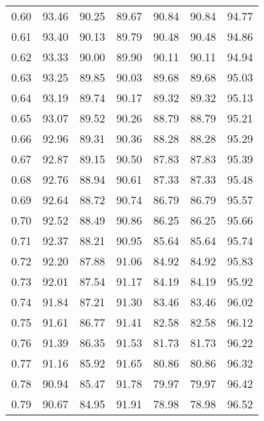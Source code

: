 \begin{tabular}{|c|c|c|c|c|c|c|}
      0.60 &     93.46 &     90.25 &      89.67 &   90.84 &      90.84 &         94.77 \\
      0.61 &     93.40 &     90.13 &      89.79 &   90.48 &      90.48 &         94.86 \\
      0.62 &     93.33 &     90.00 &      89.90 &   90.11 &      90.11 &         94.94 \\
      0.63 &     93.25 &     89.85 &      90.03 &   89.68 &      89.68 &         95.03 \\
      0.64 &     93.19 &     89.74 &      90.17 &   89.32 &      89.32 &         95.13 \\
      0.65 &     93.07 &     89.52 &      90.26 &   88.79 &      88.79 &         95.21 \\
      0.66 &     92.96 &     89.31 &      90.36 &   88.28 &      88.28 &         95.29 \\
      0.67 &     92.87 &     89.15 &      90.50 &   87.83 &      87.83 &         95.39 \\
      0.68 &     92.76 &     88.94 &      90.61 &   87.33 &      87.33 &         95.48 \\
      0.69 &     92.64 &     88.72 &      90.74 &   86.79 &      86.79 &         95.57 \\
      0.70 &     92.52 &     88.49 &      90.86 &   86.25 &      86.25 &         95.66 \\
      0.71 &     92.37 &     88.21 &      90.95 &   85.64 &      85.64 &         95.74 \\
      0.72 &     92.20 &     87.88 &      91.06 &   84.92 &      84.92 &         95.83 \\
      0.73 &     92.01 &     87.54 &      91.17 &   84.19 &      84.19 &         95.92 \\
      0.74 &     91.84 &     87.21 &      91.30 &   83.46 &      83.46 &         96.02 \\
      0.75 &     91.61 &     86.77 &      91.41 &   82.58 &      82.58 &         96.12 \\
      0.76 &     91.39 &     86.35 &      91.53 &   81.73 &      81.73 &         96.22 \\
      0.77 &     91.16 &     85.92 &      91.65 &   80.86 &      80.86 &         96.32 \\
      0.78 &     90.94 &     85.47 &      91.78 &   79.97 &      79.97 &         96.42 \\
      0.79 &     90.67 &     84.95 &      91.91 &   78.98 &      78.98 &         96.52 \\

\end{tabular}
